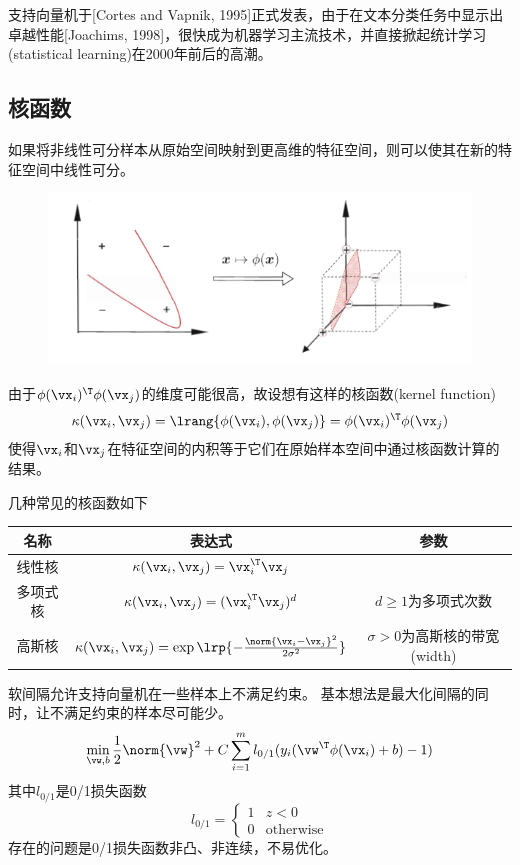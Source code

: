 支持向量机于[Cortes and Vapnik, 1995]正式发表，由于在文本分类任务中显示出卓越性能[Joachims, 1998]，很快成为机器学习主流技术，并直接掀起统计学习(statistical learning)在2000年前后的高潮。

\subsection{核函数}
如果将非线性可分样本从原始空间映射到更高维的特征空间，则可以使其在新的特征空间中线性可分。
\begin{figure}[H]
\centering
\includegraphics[width=0.6\linewidth]{fig/xor-nonlinear.png}
\end{figure}

由于$\phi(\vx_i)^\T\phi(\vx_j)$的维度可能很高，故设想有这样的核函数(kernel function)
\[\kappa(\vx_i,\vx_j)=\lrang{\phi(\vx_i),\phi(\vx_j)}=\phi(\vx_i)^\T\phi(\vx_j)\]
使得$\vx_i$和$\vx_j$在特征空间的内积等于它们在原始样本空间中通过核函数计算的结果。

几种常见的核函数如下
\begin{center}
\begin{tabular}{ccc}\hline
名称 & 表达式 & 参数\\\hline
线性核 & $\kappa(\vx_i,\vx_j)=\vx_i^\T\vx_j$ & \\
多项式核 & $\kappa(\vx_i,\vx_j)=(\vx_i^\T\vx_j)^d$ & $d\geq 1$为多项式次数\\
高斯核 & $\kappa(\vx_i,\vx_j)=\exp\lrp{-\frac{\norm{\vx_i-\vx_j}^2}{2\sigma^2}}$ & $\sigma>0$为高斯核的带宽(width)\\\hline
\end{tabular}
\end{center}

软间隔允许支持向量机在一些样本上不满足约束。
基本想法是最大化间隔的同时，让不满足约束的样本尽可能少。
\[\min_{\vw,b}\frac{1}{2}\norm{\vw}^2+C\sum_{i=1}^ml_{0/1}(y_i(\vw^\T\phi(\vx_i)+b)-1)\]
其中$l_{0/1}$是0/1损失函数
\[l_{0/1}=\begin{cases}
1 & z < 0\\
0 & \text{otherwise}
\end{cases}\]
存在的问题是0/1损失函数非凸、非连续，不易优化。

